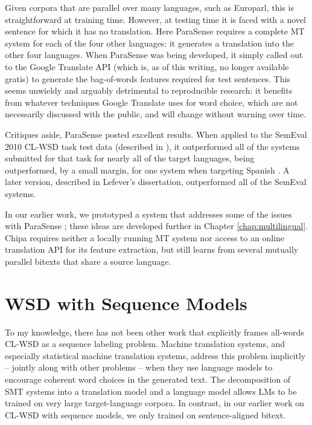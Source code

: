 Given corpora that are parallel over many languages, such as Europarl, this is
straightforward at training time. However, at testing time it is faced with a
novel sentence for which it has no translation. Here ParaSense requires a
complete MT system for each of the four other languages: it generates a
translation into the other four languages.
When ParaSense was being developed, it simply called out to the Google
Translate API (which is, as of this writing, no longer available gratis) to
generate the bag-of-words features required for test sentences.
This seems unwieldy and arguably detrimental to reproducible research: it
benefits from whatever techniques Google Translate uses for word choice,
which are not necessarily discussed with the public, and will change
without warning over time.

Critiques aside, ParaSense posted excellent results. When applied to the
SemEval 2010 CL-WSD task test data (described in
\cite{lefever-hoste:2010:SemEval}), it outperformed all of the systems
submitted for that task for nearly all of the target languages, being
outperformed, by a small margin, for one system when targeting Spanish
\cite{lefever-hoste-decock:2011:ACL-HLT2011}. A later version, described in
Lefever's dissertation, outperformed all of the SemEval systems.

In our earlier work, we prototyped a system that addresses some of the issues
with ParaSense \cite{rudnick-liu-gasser:2013:SemEval-2013}; these ideas are
developed further in Chapter \ref{chap:multilingual}.
Chipa requires neither a locally running MT system nor access to an online
translation API for its feature extraction, but still learns from several
mutually parallel bitexts that share a source language.

\section{WSD with Sequence Models}
To my knowledge, there has not been other work that explicitly frames all-words
CL-WSD as a sequence labeling problem. Machine translation systems, and
especially statistical machine translation systems, address this problem
implicitly -- jointly along with other problems -- when they use language
models to encourage coherent word choices in the generated text. The
decomposition of SMT systems into a translation model and a language model
allows LMs to be trained on very large target-language corpora.  In contrast,
in our earlier work on CL-WSD with sequence models, we only trained on
sentence-aligned bitext.

